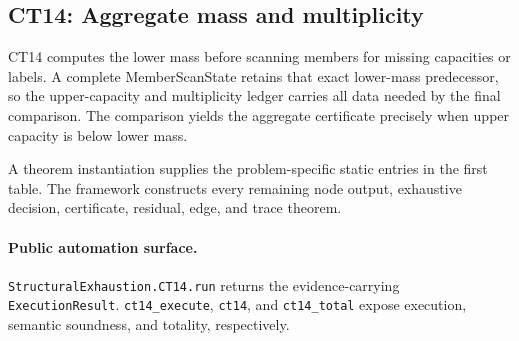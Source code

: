\subsection{CT14: Aggregate mass and multiplicity}
\label{sec:ct14-automation}

CT14 computes the lower mass before scanning members for missing capacities or labels. A complete MemberScanState retains that exact lower-mass predecessor, so the upper-capacity and multiplicity ledger carries all data needed by the final comparison. The comparison yields the aggregate certificate precisely when upper capacity is below lower mass.

A theorem instantiation supplies the problem-specific static entries in the first table. The framework constructs every remaining node output, exhaustive decision, certificate, residual, edge, and trace theorem.

\paragraph{Public automation surface.}
\texttt{StructuralExhaustion.CT14.run} returns the evidence-carrying \texttt{ExecutionResult}. \texttt{ct14\_\allowbreak{}execute}, \texttt{ct14}, and \texttt{ct14\_\allowbreak{}total} expose execution, semantic soundness, and totality, respectively.

